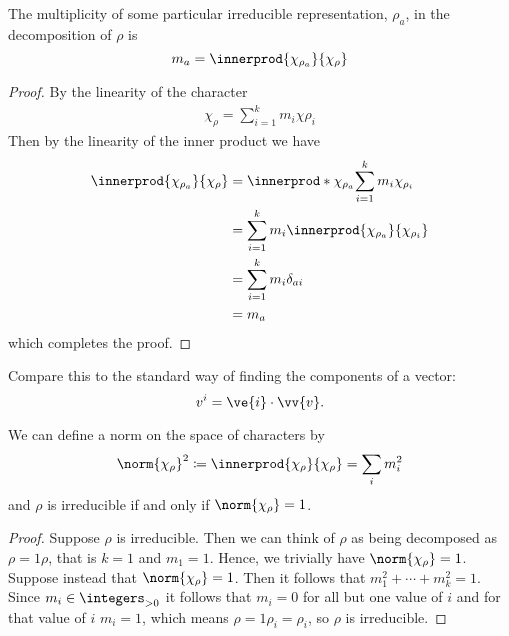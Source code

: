 \begin{crl}{}{}
    The multiplicity of some particular irreducible representation,
    \(\rho_a\), in the decomposition of \(\rho\) is
    \begin{equation}
        m_a = \innerprod{\chi_{\rho_a}}{\chi_{\rho}}
    \end{equation}
    \begin{proof}
        By the linearity of the character
        \begin{align}
            \chi_{\rho} = \sum_{i = 1}^{k} m_i\chi{\rho_i}
        \end{align}
        Then by the linearity of the inner product we have
        \begin{align}
            \innerprod{\chi_{\rho_a}}{\chi_{\rho}} &=
            \innerprod*{\chi_{\rho_a}}{\sum_{i=1}^{k}m_i\chi_{\rho_i}}\\
            &= \sum_{i = 1}^{k} m_i
            \innerprod{\chi_{\rho_a}}{\chi_{\rho_i}}\\
            &= \sum_{i = 1}^{k} m_i \delta_{ai}\\
            &= m_a
        \end{align}
        which completes the proof.
    \end{proof}
\end{crl}

Compare this to the standard way of finding the components of a vector:
\begin{equation}
    v^i = \ve{i} \cdot \vv{v}.
\end{equation}

\begin{crl}{}{}
    We can define a norm on the space of characters by
    \begin{equation}
        \norm{\chi_\rho}^{2} \coloneqq \innerprod{\chi_\rho}{\chi_\rho} =
        \sum_{i} m_i^2
    \end{equation}
    and \(\rho\) is irreducible if and only if \(\norm{\chi_\rho} = 1\).
    \begin{proof}
        Suppose \(\rho\) is irreducible.
        Then we can think of \(\rho\) as being decomposed as \(\rho =
        1\rho\), that is \(k = 1\) and \(m_1 = 1\).
        Hence, we trivially have \(\norm{\chi_\rho} = 1\).
        Suppose instead that \(\norm{\chi_\rho} = 1\).
        Then it follows that \(m_1^2 + \dotsb + m_k^2 = 1\).
        Since \(m_i \in \positiveintegers\) it follows that \(m_i = 0\) for
        all but one value of \(i\) and for that value of \(i\) \(m_i = 1\), which means
        \(\rho = 1\rho_i = \rho_i\), so \(\rho\) is irreducible.
    \end{proof}
\end{crl}

